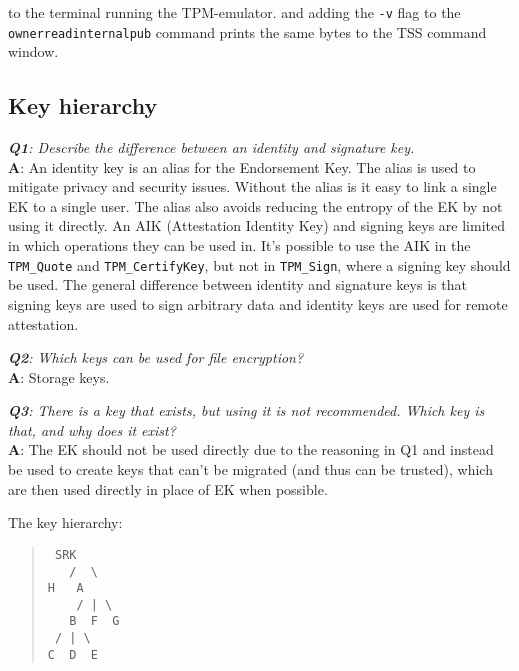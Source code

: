 \documentclass[10pt]{article}
\newcommand{\command}[1]{\texttt{#1}}
\newcommand{\Q}[2]{\textit{\textbf{Q#1}: #2}}
\newcommand{\A}[1]{\textbf{A}: #1}
\begin{document}
      to the terminal running the TPM-emulator.
      and adding the \command{-v} flag to the \\
      \command{ownerreadinternalpub} command
      prints the same bytes to the TSS command window.

  \subsection{Key hierarchy}

    \Q{1}{Describe the difference between an identity and signature key.}\\
    \A{
      An identity key is an alias for the Endorsement Key. The alias is used
      to mitigate privacy and security issues. Without the alias is it easy to
      link a single EK to a single user. The alias also avoids reducing the
      entropy of the EK by not using it directly. An AIK (Attestation Identity
      Key) and signing keys are limited in which operations they can be used
      in. It's possible to use the AIK in the \command{TPM\_Quote} and
      \command{TPM\_CertifyKey}, but not in \command{TPM\_Sign}, where a
      signing key should be used. The general difference between identity and
      signature keys is that signing keys are used to sign arbitrary data and
      identity keys are used for remote attestation.
  }

    \Q{2}{Which keys can be used for file encryption?}\\
    \A{Storage keys.}

    \Q{3}{
      There is a key that exists, but using it is not recommended. Which key
      is that, and why does it exist?
    }\\
    \A{
      The EK should not be used directly due to the reasoning in Q1 and
      instead be used to create keys that can't be migrated (and thus can be
      trusted), which are then used directly in place of EK when possible.
    }

    The key hierarchy:
    \begin{quote}
      \texttt{
SRK\ \\
\ \ \ /\ \ \textbackslash \\
H\ \ \ A \\
\ \ \ \ /\ |\ \textbackslash \\
\ \ \ B\ \ F\ \ G \\
\ /\ |\ \textbackslash \\
C\ \ D\ \ E \\
      }
    \end{quote}
\end{document}
